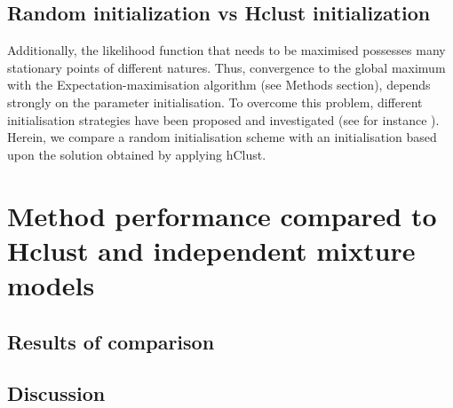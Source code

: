 	\subsection{Random initialization vs Hclust initialization}
	Additionally, the likelihood function that needs to be maximised possesses many stationary points of different natures. Thus, convergence to the global maximum with the Expectation-maximisation algorithm (see Methods section), depends strongly on the parameter initialisation. To overcome this problem, different initialisation strategies have been proposed and investigated (see for instance \cite{biernacki03,karlis03,mclachlan04}). Herein, we compare a random initialisation scheme with an initialisation based upon the solution obtained by applying hClust.\\

\section{Method performance compared to Hclust and independent mixture models}
	\subsection{Results of comparison}
	\subsection{Discussion}





